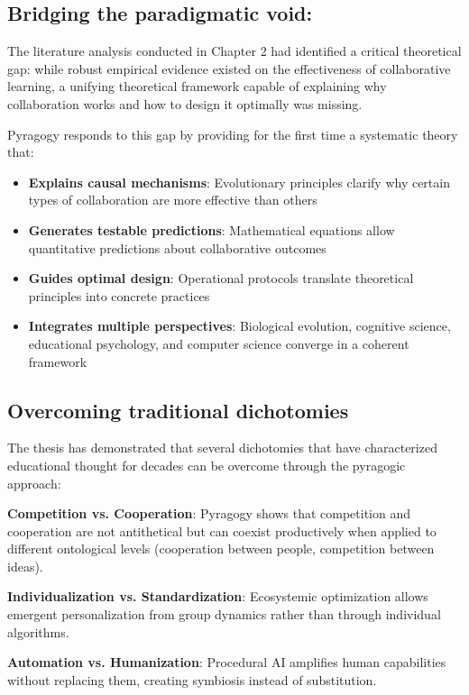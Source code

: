 \subsection*{Bridging the paradigmatic void:}

The literature analysis conducted in Chapter 2 had identified a critical theoretical gap: while robust empirical evidence existed on the effectiveness of collaborative learning, a unifying theoretical framework capable of explaining why collaboration works and how to design it optimally was missing.

Pyragogy responds to this gap by providing for the first time a systematic theory that:

\begin{itemize}
	\item \textbf{Explains causal mechanisms}: Evolutionary principles clarify why certain types of collaboration are more effective than others
	\item \textbf{Generates testable predictions}: Mathematical equations allow quantitative predictions about collaborative outcomes
	\item \textbf{Guides optimal design}: Operational protocols translate theoretical principles into concrete practices
	\item \textbf{Integrates multiple perspectives}: Biological evolution, cognitive science, educational psychology, and computer science converge in a coherent framework
\end{itemize}

\subsection{Overcoming traditional dichotomies}

The thesis has demonstrated that several dichotomies that have characterized educational thought for decades can be overcome through the pyragogic approach:

\textbf{Competition vs. Cooperation}: Pyragogy shows that competition and cooperation are not antithetical but can coexist productively when applied to different ontological levels (cooperation between people, competition between ideas).

\textbf{Individualization vs. Standardization}: Ecosystemic optimization allows emergent personalization from group dynamics rather than through individual algorithms.

\textbf{Automation vs. Humanization}: Procedural AI amplifies human capabilities without replacing them, creating symbiosis instead of substitution.

